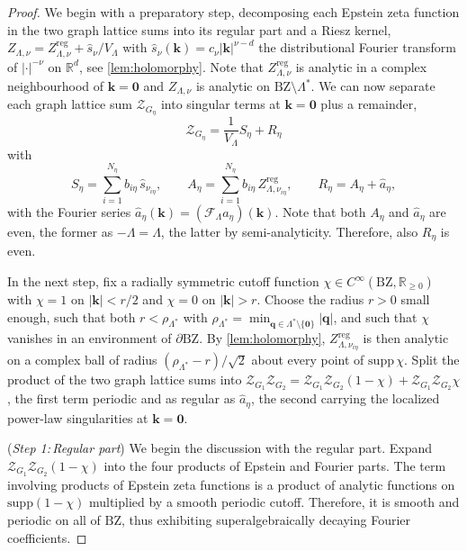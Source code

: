 \documentclass[]{amsart}
\numberwithin{mythm}{section}
\begin{document}
\begin{proof}
We begin with a preparatory step, decomposing each Epstein zeta function in the two graph lattice sums into its regular part and a Riesz kernel,
$Z_{\Lambda,\nu}=Z^{\mathrm{reg}}_{\Lambda,\nu}+\hat s_\nu/V_\Lambda$ with
$\hat s_\nu(\bm k)=c_\nu|\bm k|^{\nu-d}$ the distributional Fourier transform of $\vert\bm \cdot\vert^{-\nu}$ on $\mathds R^d$, see \cref{lem:holomorphy}. Note that $Z^{\mathrm{reg}}_{\Lambda,\nu}$ is analytic in a complex
neighbourhood of $\bm k=\bm 0$ and $Z_{\Lambda,\nu}$ is analytic on
$\mathrm{BZ}\setminus\Lambda^\ast$. We can now separate each graph lattice sum $\mathcal Z_{G_\eta}$ into singular terms at $\bm k=\bm 0$ plus a remainder, 
\[
\mathcal Z_{G_\eta}=\frac{1}{V_\Lambda}S_\eta+R_\eta
\]
with
\[
S_\eta=\sum_{i=1}^{N_\eta} b_{i\eta}\,\hat s_{\nu_{i\eta}},
\qquad
A_\eta=\sum_{i=1}^{N_\eta} b_{i\eta}\,Z^{\mathrm{reg}}_{\Lambda,\nu_{i\eta}},
\qquad
R_\eta=A_\eta+\hat a_\eta,
\]
with the Fourier series $\hat a_\eta(\bm k)= (\mathcal F_\Lambda a_\eta)(\bm k)$.
Note that both $A_\eta$ and $\hat a_\eta$ are even, the former as $-\Lambda=\Lambda$, the latter by semi-analyticity. Therefore, also $R_\eta$ is even.

In the next step, fix a radially symmetric cutoff function $\chi\in C^\infty(\mathrm{BZ},\mathds R_{\ge0})$ with $\chi=1$ on $|\bm k|<r/2$ and $\chi=0$ on $|\bm k|>r$. Choose the radius $r>0$ small enough, such that both $r<\rho_{\Lambda^\ast}$ with $\rho_{\Lambda^\ast}=\min_{\bm q\in\Lambda^\ast\setminus\{\bm 0\}}|\bm q|$, and such that $\chi$ vanishes in an environment of $\partial\mathrm{BZ}$.  By \cref{lem:holomorphy}, $Z^{\mathrm{reg}}_{\Lambda,\nu_{i\eta}}$ is then analytic on a complex ball of radius
$(\rho_{\Lambda^\ast}-r)/\sqrt2$ about every point of $\mathrm{supp}\,\chi$. Split the product of the two graph lattice sums into $\mathcal Z_{G_1} \mathcal Z_{G_2}=\mathcal Z_{G_1} \mathcal Z_{G_2}(1-\chi)+\mathcal Z_{G_1} \mathcal Z_{G_2}\chi$, the first term periodic and as regular as $\hat a_\eta$, the second carrying the localized power-law singularities at $\bm k=\bm 0$.

(\emph{Step 1:\,Regular part}) We begin the discussion with the regular part. Expand $\mathcal Z_{G_1}\mathcal Z_{G_2}(1-\chi)$ into the four products of Epstein and Fourier parts. The term involving products of Epstein zeta functions is a product of analytic functions on $\mathrm{supp}(1-\chi)$ multiplied by a smooth periodic cutoff. 
Therefore, it is smooth and periodic on all of $\mathrm{BZ}$, thus exhibiting superalgebraically decaying Fourier coefficients. 


\end{proof}
\end{document}
